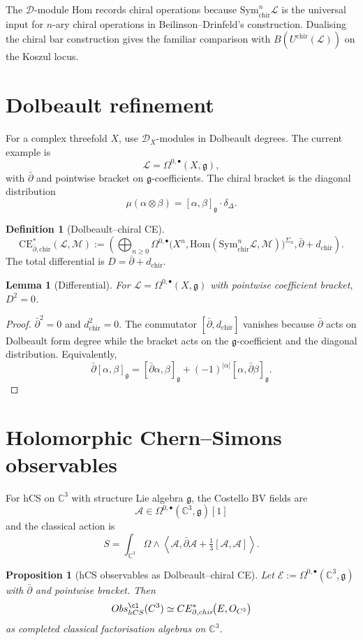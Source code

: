 \documentclass[11pt]{amsart}
\providecommand{\C}{\mathbb{C}}
\providecommand{\dbar}{\bar{\partial}}
\providecommand{\g}{\mathfrak{g}}
\providecommand{\Obs}{\mathrm{Obs}}
\providecommand{\Sym}{\mathrm{Sym}}
\providecommand{\CE}{\mathrm{CE}}
\providecommand{\chir}{\mathrm{chir}}
\providecommand{\Hom}{\mathrm{Hom}}
\providecommand{\cL}{\mathcal{L}}
\providecommand{\cM}{\mathcal{M}}
\providecommand{\cA}{\mathcal{A}}
\providecommand{\cE}{\mathcal{E}}
\providecommand{\cD}{\mathcal{D}}
\providecommand{\cO}{\mathcal{O}}
\theoremstyle{plain}
\newtheorem{proposition}[theorem]{Proposition}
\newtheorem{lemma}[theorem]{Lemma}
\theoremstyle{definition}
\newtheorem{definition}[theorem]{Definition}
\theoremstyle{remark}
\begin{document}
The $\cD$-module Hom records chiral operations because
$\Sym^n_{\chir}\cL$ is the universal input for $n$-ary chiral
operations in Beilinson--Drinfeld's construction. Dualising the chiral
bar construction gives the familiar comparison with
$B(U^{\chir}(\cL))$ on the Koszul locus.

\section{Dolbeault refinement}
For a complex threefold $X$, use $\cD_X$-modules in Dolbeault degrees.
The current example is
\[
  \cL=\Omega^{0,\bullet}(X,\g),
\]
with $\dbar$ and pointwise bracket on $\g$-coefficients. The chiral
bracket is the diagonal distribution
\[
  \mu(\alpha\otimes\beta)=[\alpha,\beta]_\g\cdot\delta_\Delta .
\]

\begin{definition}[Dolbeault--chiral CE]
\label{def:dolbeault-chiral-ce}
\[
 \CE^*_{\dbar,\chir}(\cL,\cM)
 :=
 \left(
   \bigoplus_{n\geq0}
   \Omega^{0,\bullet}\!\bigl(
     X^n,\Hom(\Sym^n_{\chir}\cL,\cM)
   \bigr)^{\Sigma_n},
   \dbar+d_{\chir}
 \right).
\]
The total differential is $D=\dbar+d_{\chir}$.
\end{definition}

\begin{lemma}[Differential]
\label{lem:dolbeault-chiral-differential}
For $\cL=\Omega^{0,\bullet}(X,\g)$ with pointwise coefficient bracket,
$D^2=0$.
\end{lemma}

\begin{proof}
$\dbar^2=0$ and $d_{\chir}^2=0$. The commutator
$[\dbar,d_{\chir}]$ vanishes because $\dbar$ acts on Dolbeault form
degree while the bracket acts on the $\g$-coefficient and the diagonal
distribution. Equivalently,
\[
  \dbar[\alpha,\beta]_\g
  =
  [\dbar\alpha,\beta]_\g+(-1)^{|\alpha|}[\alpha,\dbar\beta]_\g .
\]
\end{proof}

\section{Holomorphic Chern--Simons observables}
For hCS on $\C^3$ with structure Lie algebra $\g$, the Costello BV
fields are
\[
  \cA\in\Omega^{0,\bullet}(\C^3,\g)[1]
\]
and the classical action is
\[
  S=
  \int_{\C^3}\Omega\wedge
  \left\langle \cA,\dbar\cA+\tfrac13[\cA,\cA]\right\rangle .
\]

\begin{proposition}[hCS observables as Dolbeault--chiral CE]
\label{prop:hcs-obs-chiral-ce}
Let $\cE:=\Omega^{0,\bullet}(\C^3,\g)$ with $\dbar$ and pointwise
bracket. Then
\[
 \Obs_{\mathrm{hCS}}^{\cl}(\C^3)
 \simeq
 \CE^*_{\dbar,\chir}\!\bigl(\cE,\cO_{\C^3}\bigr)
\]
as completed classical factorisation algebras on $\C^3$.
\end{proposition}
\end{document}
